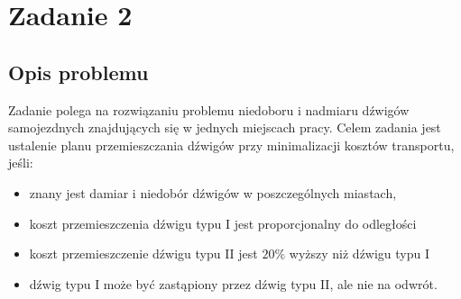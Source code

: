 \chapter{Zadanie 2}
\thispagestyle{chapterBeginStyle}
\label{rozdzial2}

\section{Opis problemu}
Zadanie polega na rozwiązaniu problemu niedoboru i nadmiaru dźwigów samojezdnych znajdujących się w jednych miejscach pracy. 
Celem zadania jest ustalenie planu przemieszczania dźwigów przy minimalizacji kosztów transportu, jeśli:

\begin{itemize}
    \item znany jest damiar i niedobór dźwigów w poszczególnych miastach,
    \item koszt przemieszczenia dźwigu typu I jest proporcjonalny do odległości
    \item koszt przemieszczenie dźwigu typu II jest $20\%$ wyższy niż dźwigu typu I
    \item dźwig typu I może być zastąpiony przez dźwig typu II, ale nie na odwrót. 
\end{itemize}

